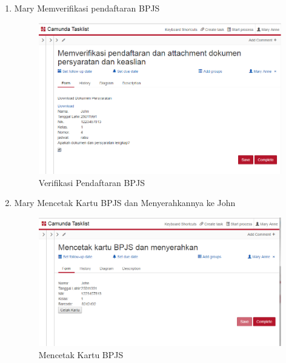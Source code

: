 \begin{enumerate}
	\item Mary Memverifikasi pendaftaran BPJS
	\begin{figure}[H]
			\centering
			\includegraphics[scale=0.6]{Gambar/Bab-3/BPMS/Kasus2/6}
			\caption{Verifikasi Pendaftaran BPJS} 
			\label{fig:otomasi_kasus2_6}
	\end{figure}
	
	\item Mary Mencetak Kartu BPJS dan Menyerahkannya ke John
	\begin{figure}[H]
			\centering
			\includegraphics[scale=0.6]{Gambar/Bab-3/BPMS/Kasus2/7}
			\caption{Mencetak Kartu BPJS} 
			\label{fig:otomasi_kasus2_7}
	\end{figure}
	
\end{enumerate}

	
